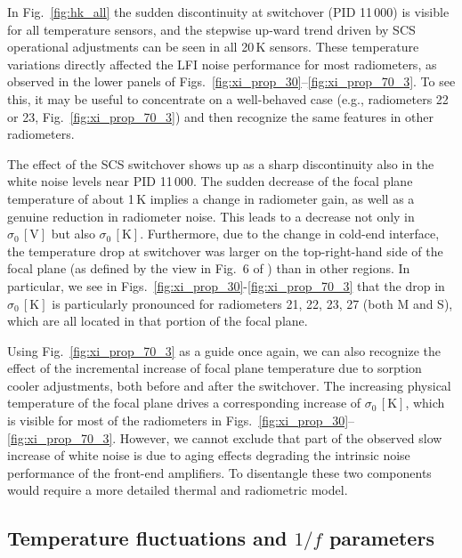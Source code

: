 \documentclass{aa}
\begin{document}
In Fig.~\ref{fig:hk_all} the sudden discontinuity at switchover (PID 11\,000) is visible 
for all temperature sensors, and the stepwise up-ward trend driven by 
SCS operational adjustments can be seen in all 20\,K sensors.
These temperature variations directly affected the
LFI noise performance for most radiometers, as observed in the lower
panels of Figs.~\ref{fig:xi_prop_30}--\ref{fig:xi_prop_70_3}. To see
this, it may be useful to concentrate on a well-behaved case (e.g.,
radiometers 22 or 23, Fig.~\ref{fig:xi_prop_70_3}) and then recognize
the same features in other radiometers.

The effect of the SCS switchover shows up as a sharp discontinuity
also in the white noise levels near PID 11\,000. The sudden decrease of
the focal plane temperature of about 1\,K implies a change in
radiometer gain, as well as a genuine reduction in radiometer
noise. This leads to a decrease not only in $\sigma_0 \,\mathrm{[V]}$ but also $\sigma_0 \,\mathrm{[K]}$. Furthermore, due to the change in cold-end
interface, the temperature drop at switchover was larger on the
top-right-hand side of the focal plane (as defined by the view in
Fig.~6 of \citealp{bp01}) than in other regions. In particular, we
see in Figs.~\ref{fig:xi_prop_30}-\ref{fig:xi_prop_70_3} that the
drop in $\sigma_0 \,\mathrm{[K]}$ is particularly pronounced for radiometers 21,
22, 23, 27 (both M and S), which are all located in that portion of
the focal plane.

Using Fig.~\ref{fig:xi_prop_70_3} as a guide once again, we can also
recognize the effect of the incremental increase of focal plane
temperature due to sorption cooler adjustments, both before and after
the switchover. The increasing physical temperature of the focal plane
drives a corresponding increase of $\sigma_0 \,\mathrm{[K]}$, which is visible
for most of the radiometers in
Figs.~\ref{fig:xi_prop_30}--\ref{fig:xi_prop_70_3}. However, we cannot
exclude that part of the observed slow increase of white noise is due
to aging effects degrading the intrinsic noise performance of the
front-end amplifiers. To disentangle these two components would
require a more detailed thermal and radiometric model.



\subsection{Temperature fluctuations and $1/f$ parameters}
\label{sec:temp_fluct_1f}
\end{document}
